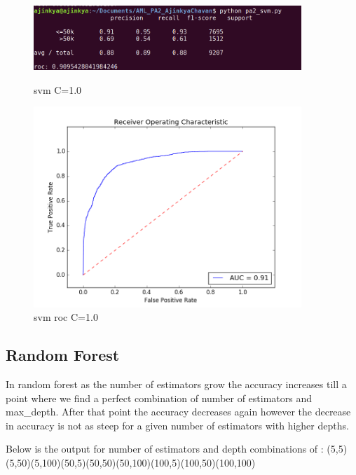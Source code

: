 \documentclass{article}
\begin{document}
\begin{figure}
    \centering
    \begin{minipage}{0.45\textwidth}
        \centering
        \includegraphics[width=0.9\textwidth]{svm_10.png} %
        \caption{svm C=1.0}
    \end{minipage}\hfill
    \begin{minipage}{0.45\textwidth}
        \centering
        \includegraphics[width=0.9\textwidth]{roc_svm_10.png} %
        \caption{svm roc C=1.0}
    \end{minipage}
\end{figure}



\subsection{Random Forest}

In random forest as the number of estimators grow the accuracy increases till a point where we find a perfect combination of number of estimators and max\_depth. After that point the accuracy decreases again however the decrease in accuracy is not as steep for a given number of estimators with higher depths. 

Below is the output for number of estimators and depth combinations of : (5,5)(5,50)(5,100)(50,5)(50,50)(50,100)(100,5)(100,50)(100,100)
\end{document}
